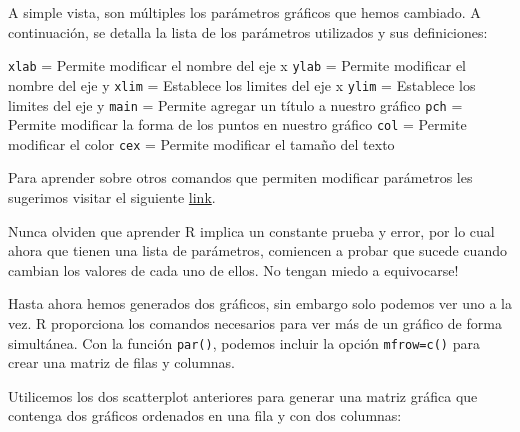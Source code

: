 \documentclass[]{book}
\newenvironment{Shaded}{\begin{snugshade}}{\end{snugshade}}
\newcommand{\DataTypeTok}[1]{\textcolor[rgb]{0.13,0.29,0.53}{#1}}
\newcommand{\DecValTok}[1]{\textcolor[rgb]{0.00,0.00,0.81}{#1}}
\newcommand{\FloatTok}[1]{\textcolor[rgb]{0.00,0.00,0.81}{#1}}
\newcommand{\KeywordTok}[1]{\textcolor[rgb]{0.13,0.29,0.53}{\textbf{#1}}}
\newcommand{\NormalTok}[1]{#1}
\newcommand{\OperatorTok}[1]{\textcolor[rgb]{0.81,0.36,0.00}{\textbf{#1}}}
\newcommand{\StringTok}[1]{\textcolor[rgb]{0.31,0.60,0.02}{#1}}
\begin{document}
A simple vista, son múltiples los parámetros gráficos que hemos cambiado. A continuación, se detalla la
lista de los parámetros utilizados y sus definiciones:

\texttt{xlab} = Permite modificar el nombre del eje x
\texttt{ylab} = Permite modificar el nombre del eje y
\texttt{xlim} = Establece los limites del eje x
\texttt{ylim} = Establece los limites del eje y
\texttt{main} = Permite agregar un título a nuestro gráfico
\texttt{pch} = Permite modificar la forma de los puntos en nuestro gráfico
\texttt{col} = Permite modificar el color
\texttt{cex} = Permite modificar el tamaño del texto

Para aprender sobre otros comandos que permiten modificar parámetros les sugerimos visitar el siguiente \href{https://www.statmethods.net/advgraphs/parameters.html}{link}.

Nunca olviden que aprender R implica un constante prueba y error, por lo cual ahora que tienen una lista de
parámetros, comiencen a probar que sucede cuando cambian los valores de cada uno de ellos. No tengan
miedo a equivocarse!

Hasta ahora hemos generados dos gráficos, sin embargo solo podemos ver uno a la vez. R proporciona los
comandos necesarios para ver más de un gráfico de forma simultánea. Con la función \texttt{par()}, podemos
incluir la opción \texttt{mfrow=c()} para crear una matriz de filas y columnas.

Utilicemos los dos scatterplot anteriores para generar una matriz gráfica que contenga dos gráficos
ordenados en una fila y con dos columnas:

\begin{Shaded}
\end{Shaded}
\end{document}
